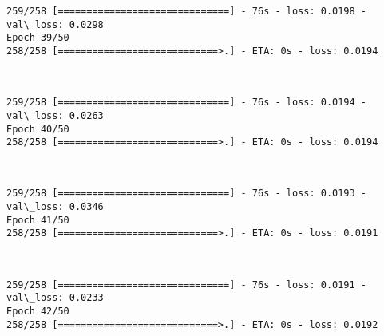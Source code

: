 \documentclass[11pt]{article}
\begin{document}
    \begin{Verbatim}[commandchars=\\\{\}]
259/258 [==============================] - 76s - loss: 0.0198 - val\_loss: 0.0298
Epoch 39/50
258/258 [============================>.] - ETA: 0s - loss: 0.0194
    \end{Verbatim}

    \begin{center}
    \end{center}
    { \hspace*{\fill} \\}
    
    \begin{Verbatim}[commandchars=\\\{\}]
259/258 [==============================] - 76s - loss: 0.0194 - val\_loss: 0.0263
Epoch 40/50
258/258 [============================>.] - ETA: 0s - loss: 0.0194
    \end{Verbatim}

    \begin{center}
    \end{center}
    { \hspace*{\fill} \\}
    
    \begin{Verbatim}[commandchars=\\\{\}]
259/258 [==============================] - 76s - loss: 0.0193 - val\_loss: 0.0346
Epoch 41/50
258/258 [============================>.] - ETA: 0s - loss: 0.0191
    \end{Verbatim}

    \begin{center}
    \end{center}
    { \hspace*{\fill} \\}
    
    \begin{Verbatim}[commandchars=\\\{\}]
259/258 [==============================] - 76s - loss: 0.0191 - val\_loss: 0.0233
Epoch 42/50
258/258 [============================>.] - ETA: 0s - loss: 0.0192
    \end{Verbatim}

    \begin{center}
    \end{center}
    { \hspace*{\fill} \\}
    
\end{document}
